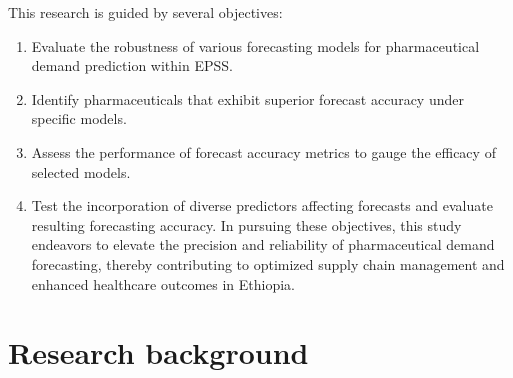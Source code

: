 \documentclass[
  authoryear,
  preprint,
  3p]{elsarticle}
\providecommand{\tightlist}{%
  \setlength{\itemsep}{0pt}\setlength{\parskip}{0pt}}\usepackage{longtable,booktabs,array}
\begin{document}
This research is guided by several objectives:

\begin{enumerate}
\def\labelenumi{\arabic{enumi}.}
\tightlist
\item
  Evaluate the robustness of various forecasting models for
  pharmaceutical demand prediction within EPSS.
\item
  Identify pharmaceuticals that exhibit superior forecast accuracy under
  specific models.
\item
  Assess the performance of forecast accuracy metrics to gauge the
  efficacy of selected models.
\item
  Test the incorporation of diverse predictors affecting forecasts and
  evaluate resulting forecasting accuracy. In pursuing these objectives,
  this study endeavors to elevate the precision and reliability of
  pharmaceutical demand forecasting, thereby contributing to optimized
  supply chain management and enhanced healthcare outcomes in Ethiopia.
\end{enumerate}

\hypertarget{sec-lit}{%
\section{Research background}\label{sec-lit}}
\end{document}
